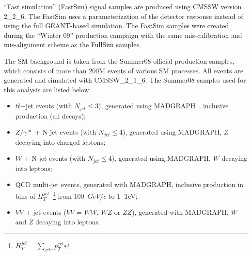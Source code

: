 ``Fast simulation'' (FastSim) signal samples are produced using CMSSW version 2\_2\_6.
The FastSim uses a parameterization of the detector response instead of using the full GEANT-based simulation.
The FastSim samples were created during the ``Winter 09'' production campaign with the same mis-calibration 
and mis-alignment scheme as the FullSim samples.

The SM background is taken from the Summer08 official production samples,
which consists of more than 200M events of various SM processes.
All events are generated and simulated with CMSSW\_2\_1\_6. 
The Summer08 samples used for this analysis are listed below:
\begin{itemize}
%
\item $t\bar{t}$+jet events (with $N_{jet}\le$3), generated using MADGRAPH~\cite{Alwall:2007st}, inclusive production (all decays); 
%
\item $Z/\gamma*$ + N jet events (with $N_{jet}\le$4), generated using MADGRAPH, $Z$ decaying into charged leptons;  
%
\item $W$ + N jet events (with $N_{jet}\le$4), generated using MADGRAPH, $W$ decaying into leptons; 
%
\item QCD multi-jet events, generated with MADGRAPH, inclusive production in 
bins of $H_{T}^{jet}$~\footnote{$H_{T}^{jet}=\sum_{jets} p_T^{jet}$} from 100~$GeV/c$ to 1~TeV;  
%
%
\item $VV$ + jet events ($VV$ = $WW$, $WZ$ or $ZZ$), generated with MADGRAPH, 
$W$ and $Z$ decaying into leptons.
\end{itemize} 


